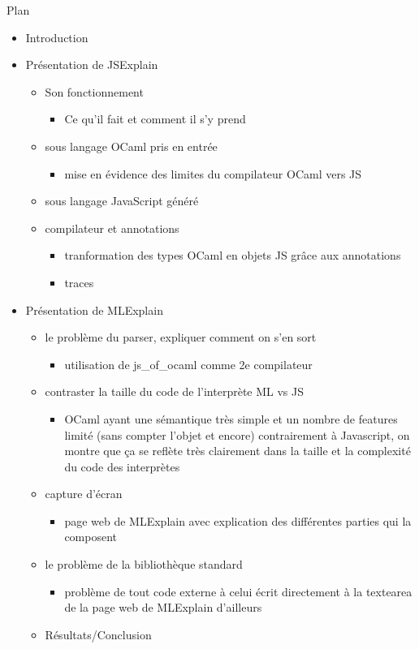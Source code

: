 \documentclass{easychair}
\begin{document}
Plan
\begin{itemize}
\item Introduction
\item Présentation de JSExplain
  \begin{itemize}
  \item Son fonctionnement
    \begin{itemize}
    \item Ce qu'il fait et comment il s'y prend
    \end{itemize}
  \item sous langage OCaml pris en entrée
    \begin{itemize}
    \item mise en évidence des limites du compilateur OCaml vers JS
    \end{itemize}
  \item sous langage JavaScript généré
  \item compilateur et annotations
    \begin{itemize}
    \item tranformation des types OCaml en objets JS grâce aux annotations
    \item traces
    \end{itemize}
  \end{itemize}
\item Présentation de MLExplain
  \begin{itemize}
  \item le problème du parser, expliquer comment on s'en sort
    \begin{itemize}
    \item utilisation de js\_of\_ocaml comme 2e compilateur
    \end{itemize}
  \item contraster la taille du code de l'interprète ML vs JS
    \begin{itemize}
    \item OCaml ayant une sémantique très simple et un nombre de features limité (sans compter l'objet et encore) contrairement à Javascript, on montre que ça se reflète très clairement dans la taille et la complexité du code des interprètes
    \end{itemize}
  \item capture d'écran
    \begin{itemize}
    \item page web de MLExplain avec explication des différentes parties qui la composent
    \end{itemize}
  \item le problème de la bibliothèque standard
    \begin{itemize}
    \item problème de tout code externe à celui écrit directement à la textearea de la page web de MLExplain d'ailleurs
    \end{itemize}
  \item Résultats/Conclusion
  \end{itemize}
\end{itemize}
\end{document}
